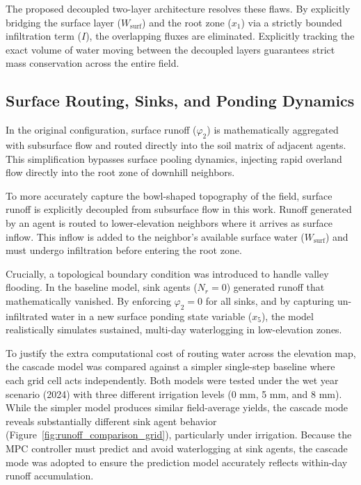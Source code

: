 The proposed decoupled two-layer architecture resolves these flaws. By explicitly bridging the surface layer ($W_{\text{surf}}$) and the root zone ($x_1$) via a strictly bounded infiltration term ($I$), the overlapping fluxes are eliminated. Explicitly tracking the exact volume of water moving between the decoupled layers guarantees strict mass conservation across the entire field.

\subsection{Surface Routing, Sinks, and Ponding Dynamics}
\label{sec:runoff}

In the original configuration, surface runoff ($\varphi_2$) is mathematically aggregated with subsurface flow and routed directly into the soil matrix of adjacent agents. This simplification bypasses surface pooling dynamics, injecting rapid overland flow directly into the root zone of downhill neighbors. 

To more accurately capture the bowl-shaped topography of the field, surface runoff is explicitly decoupled from subsurface flow in this work. Runoff generated by an agent is routed to lower-elevation neighbors where it arrives as surface inflow. This inflow is added to the neighbor's available surface water ($W_{\text{surf}}$) and must undergo infiltration before entering the root zone. 

Crucially, a topological boundary condition was introduced to handle valley flooding. In the baseline model, sink agents ($N_r = 0$) generated runoff that mathematically vanished. By enforcing $\varphi_2 = 0$ for all sinks, and by capturing un-infiltrated water in a new surface ponding state variable ($x_5$), the model realistically simulates sustained, multi-day waterlogging in low-elevation zones.

To justify the extra computational cost of routing water across the elevation map, the cascade model was compared against a simpler single-step baseline where each grid cell acts independently. Both models were tested under the wet year scenario (2024) with three different irrigation levels (0 mm, 5 mm, and 8 mm). While the simpler model produces similar field-average yields, the cascade mode reveals substantially different sink agent behavior (Figure~\ref{fig:runoff_comparison_grid}), particularly under irrigation. Because the MPC controller must predict and avoid waterlogging at sink agents, the cascade mode was adopted to ensure the prediction model accurately reflects within-day runoff accumulation.

